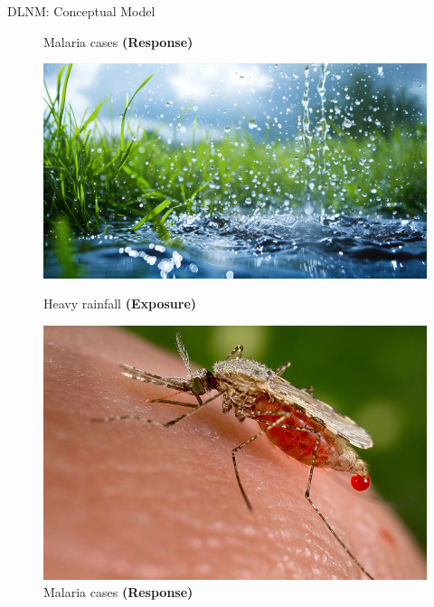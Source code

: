 \documentclass[english]{beamer}
\newcommand{\alertblue}[1]{{\color{blue}#1}}
\begin{document}
\begin{frame}{DLNM: Conceptual Model}
\begin{figure}
\begin{minipage}{0.2\linewidth}
        \caption{\footnotesize Malaria cases \textbf{(Response)}}
    \end{minipage}
\end{figure}
\begin{figure}
    \centering
    \begin{minipage}{0.2\linewidth}
        \includegraphics[width=\linewidth]{images/rainfall.jpg}
        \caption{\footnotesize Heavy rainfall \textbf{(Exposure)}}
    \end{minipage}
    \hspace{0.5cm}
    \hspace{0.5cm}
    \begin{minipage}{0.2\linewidth}
        \centering
        \includegraphics[width=\linewidth]{images/malaria.jpeg}
        \caption{\footnotesize Malaria cases \textbf{(Response)}}
    \end{minipage}
\end{figure}
\end{frame}
\end{document}
